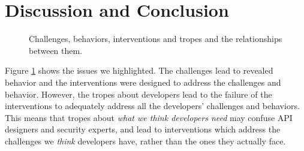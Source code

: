 \documentclass[conference]{IEEEtran}
\begin{document}
\section{Discussion and Conclusion}
\begin{figure}
\centering
{}
\caption{Challenges, behaviors, interventions and tropes and the relationships between them.}
  \label{fig:circle}
\end{figure}

Figure \ref{fig:circle} shows the issues we highlighted. The challenges lead to revealed behavior and the interventions were designed to address the challenges and behavior. However, the tropes about developers lead to the failure of the interventions to adequately address all the developers' challenges and behaviors.  This means that tropes about \emph{what we think developers need} may confuse API designers and security experts, and lead to interventions which address the challenges we \emph{think} developers have, rather than the ones they actually face.
\end{document}
